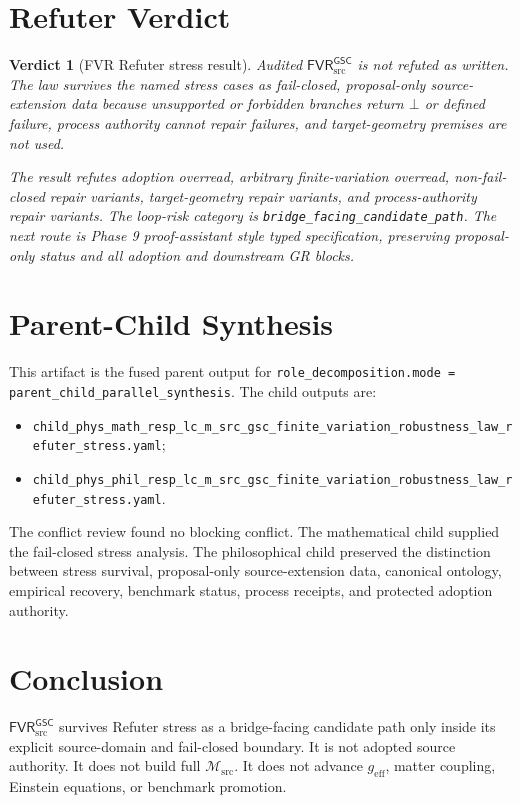 \documentclass[11pt]{article}
\newcommand{\Msrc}{\mathcal{M}_{\mathrm{src}}}
\newcommand{\geff}{g_{\mathrm{eff}}}
\newcommand{\FVR}{\mathsf{FVR}_{\mathrm{src}}^{\mathsf{GSC}}}
\newcommand{\Bot}{\bot}
\newtheorem{verdict}{Verdict}
\begin{document}
\section{Refuter Verdict}

\begin{verdict}[FVR Refuter stress result]
Audited \(\FVR\) is not refuted as written. The law survives the named stress
cases as fail-closed, proposal-only source-extension data because unsupported
or forbidden branches return \(\Bot\) or defined failure, process authority
cannot repair failures, and target-geometry premises are not used.

The result refutes adoption overread, arbitrary finite-variation overread,
non-fail-closed repair variants, target-geometry repair variants, and
process-authority repair variants. The loop-risk category is
\texttt{bridge\_facing\_candidate\_path}. The next route is Phase 9
proof-assistant style typed specification, preserving proposal-only status
and all adoption and downstream GR blocks.
\end{verdict}

\section{Parent-Child Synthesis}

This artifact is the fused parent output for
\texttt{role\_decomposition.mode = parent\_child\_parallel\_synthesis}. The
child outputs are:
\begin{itemize}
  \item \texttt{child\_phys\_math\_resp\_lc\_m\_src\_gsc\_finite\_variation\_robustness\_law\_refuter\_stress.yaml};
  \item \texttt{child\_phys\_phil\_resp\_lc\_m\_src\_gsc\_finite\_variation\_robustness\_law\_refuter\_stress.yaml}.
\end{itemize}
The conflict review found no blocking conflict. The mathematical child
supplied the fail-closed stress analysis. The philosophical child preserved
the distinction between stress survival, proposal-only source-extension data,
canonical ontology, empirical recovery, benchmark status, process receipts,
and protected adoption authority.

\section{Conclusion}

\(\FVR\) survives Refuter stress as a bridge-facing candidate path only inside
its explicit source-domain and fail-closed boundary. It is not adopted source
authority. It does not build full \(\Msrc\). It does not advance \(\geff\),
matter coupling, Einstein equations, or benchmark promotion.
\end{document}
